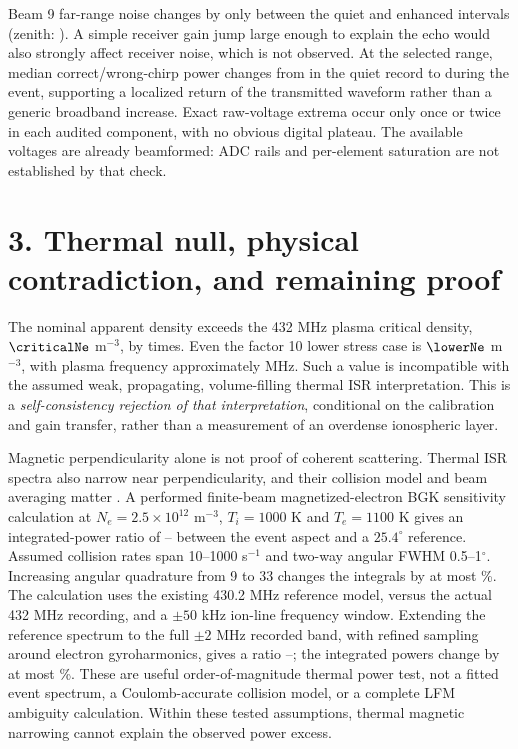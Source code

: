 \documentclass[11pt,a4paper]{article}
\begin{document}
Beam 9 far-range noise changes by only \beamNoise{} between the quiet and
enhanced intervals (zenith: \zenithNoise). A simple receiver gain jump large
enough to explain the echo would also strongly affect receiver noise, which
is not observed. At the selected range, median correct/wrong-chirp power
changes from \codeQuiet{} in the quiet record to \codeEvent{} during the
event, supporting a localized return of the transmitted waveform rather
than a generic broadband increase. Exact raw-voltage extrema occur only once
or twice in each audited component, with no obvious digital plateau.
The available voltages are already beamformed: ADC rails and per-element
saturation are not established by that check.

\clearpage
\section*{3. Thermal null, physical contradiction, and remaining proof}
The nominal apparent density exceeds the 432 MHz plasma critical density,
$\criticalNe$ m$^{-3}$, by \cutoffFactor{} times. Even the factor 10 lower
stress case is $\lowerNe$ m$^{-3}$, with plasma frequency approximately
\lowerPlasmaMHz{} MHz. Such a value is incompatible with the assumed weak,
propagating, volume-filling thermal ISR interpretation. This is a
\emph{self-consistency rejection of that interpretation}, conditional on the
calibration and gain transfer, rather than a measurement of an overdense
ionospheric layer.

Magnetic perpendicularity alone is not proof of coherent scattering.
Thermal ISR spectra also narrow near perpendicularity, and their collision
model and beam averaging matter \cite{Longley2020}. A performed finite-beam
magnetized-electron BGK sensitivity calculation at $N_e=2.5\times10^{12}$
m$^{-3}$, $T_i=1000$ K and $T_e=1100$ K gives an integrated-power ratio of
\thermalLow--\thermalHigh{} between the event aspect and a $25.4^\circ$
reference. Assumed collision rates span 10--1000 s$^{-1}$ and two-way angular
FWHM 0.5--1$^\circ$. Increasing angular quadrature from 9 to 33 changes the
integrals by at most \angleRefinement\%. The calculation uses the existing
430.2 MHz reference model, versus the actual 432 MHz recording, and a
$\pm50$ kHz ion-line frequency window. Extending the reference spectrum to
the full $\pm2$ MHz recorded band, with refined sampling around electron
gyroharmonics, gives a ratio \fullThermalLow--\fullThermalHigh{}; the
integrated powers change by at most \fullBandChange\%. These are useful
order-of-magnitude thermal
power test, not a fitted event spectrum, a Coulomb-accurate collision model,
or a complete LFM ambiguity calculation. Within these tested assumptions,
thermal magnetic narrowing cannot explain the observed power excess.
\end{document}
